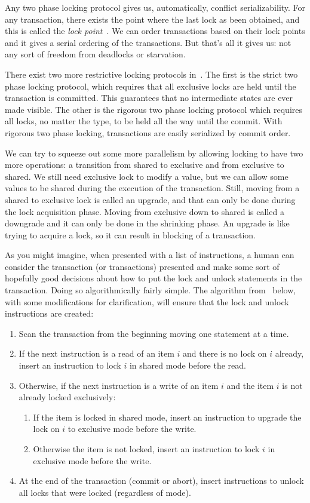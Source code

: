 Any two phase locking protocol gives us, automatically, conflict serializability. For any transaction, there exists the point where the last lock as been obtained, and this is called the \textit{lock point}~\cite{dsc}. We can order transactions based on their lock points and it gives a serial ordering of the transactions. But that's all it gives us: not any sort of freedom from deadlocks or starvation.

There exist two more restrictive locking protocols in~\cite{dsc}. The first is the strict two phase locking protocol, which requires that all exclusive locks are held until the transaction is committed. This guarantees that no intermediate states are ever made visible. The other is the rigorous two phase locking protocol which requires all locks, no matter the type, to be held all the way until the commit. With rigorous two phase locking, transactions are easily serialized by commit order.

We can try to squeeze out some more parallelism by allowing locking to have two more operations: a transition from shared to exclusive and from exclusive to shared. We still need exclusive lock to modify a value, but we can allow some values to be shared during the execution of the transaction. Still, moving from a shared to exclusive lock is called an upgrade, and that can only be done during the lock acquisition phase. Moving from exclusive down to shared is called a downgrade and it can only be done in the shrinking phase. An upgrade is like trying to acquire a lock, so it can result in blocking of a transaction.

As you might imagine, when presented with a list of instructions, a human can consider the transaction (or transactions) presented and make some sort of hopefully good decisions about how to put the lock and unlock statements in the transaction. Doing so algorithmically fairly simple. The algorithm from~\cite{dsc} below, with some modifications for clarification, will ensure that the lock and unlock instructions are created:

\begin{enumerate}
	\item Scan the transaction from the beginning moving one statement at a time.
	\item If the next instruction is a read of an item $i$ and there is no lock on $i$ already, insert an instruction to lock $i$ in shared mode before the read.
	\item Otherwise, if the next instruction is a write of an item $i$ and the item $i$ is not already locked exclusively:
		\begin{enumerate}
			\item If the item is locked in shared mode, insert an instruction to upgrade the lock on $i$ to exclusive mode before the write.
			\item Otherwise the item is not locked, insert an instruction to lock $i$ in exclusive mode before the write.
		\end{enumerate}
	\item At the end of the transaction (commit or abort), insert instructions to unlock all locks that were locked (regardless of mode).
\end{enumerate}

